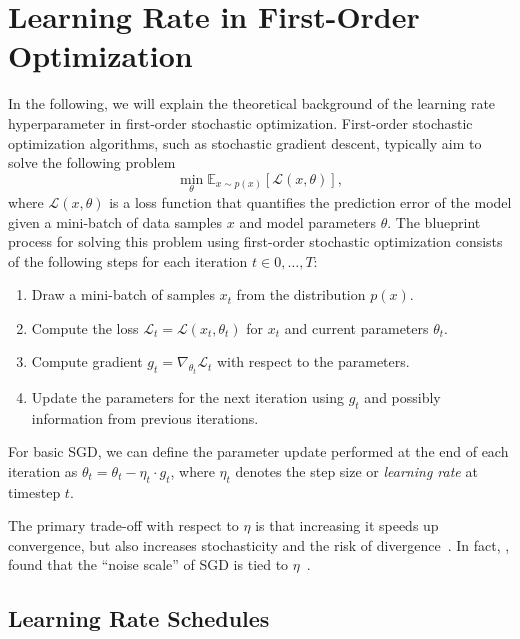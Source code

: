 \documentclass{article} %
\begin{document}
\section{Learning Rate in First-Order Optimization}

In the following, we will explain the theoretical background of the learning rate hyperparameter in first-order stochastic optimization.
First-order stochastic optimization algorithms, such as stochastic gradient descent, typically aim to solve the following problem
\begin{equation}
   \min_{\theta} \mathbb{E}_{x \sim p(x)} [\mathcal{L}(x, \theta)],
\end{equation}
where $\mathcal{L}(x, \theta)$ is a loss function that quantifies the prediction error of the model given a mini-batch of data samples $x$ and model parameters $\theta$.
The blueprint process for solving this problem using first-order stochastic optimization consists of the following steps for each iteration $t \in 0, \ldots, T$:
\begin{enumerate}
   \item Draw a mini-batch of samples $x_t$ from the distribution $p(x)$.
   \item Compute the loss $\mathcal{L}_t = \mathcal{L}(x_t, \theta_t)$ for $x_t$ and current parameters $\theta_t$.
   \item Compute gradient $g_t = \nabla_{\theta_t} \mathcal{L}_t$ with respect to the parameters.
   \item Update the parameters for the next iteration using $g_t$ and possibly information from previous iterations.
\end{enumerate}

For basic SGD, we can define the parameter update performed at the end of each iteration as
$\theta_{t}  = \theta_{t} - \eta_t \cdot g_t$,
where $\eta_t$ denotes the step size or \textit{learning rate} at timestep $t$.

The primary trade-off with respect to $\eta$ is that increasing it speeds up convergence, but also increases stochasticity and the risk of divergence~\citep{bengioPracticalRecommendationsGradientbased2012}.
In fact, \citet{smithBayesianPerspectiveGeneralization2018}, found that the “noise scale” of SGD is tied to $\eta$~\citep{smithBayesianPerspectiveGeneralization2018}.

\subsection{Learning Rate Schedules}
\end{document}
